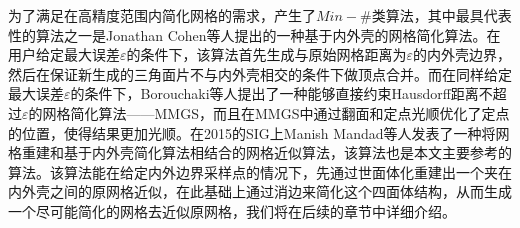为了满足在高精度范围内简化网格的需求，产生了$Min−\#$类算法，其中最具代表性的算法之一是Jonathan Cohen等人提出的一种基于内外壳的网格简化算法\cite{simp-envlop}。在用户给定最大误差$\varepsilon$的条件下，该算法首先生成与原始网格距离为$\varepsilon$的内外壳边界，然后在保证新生成的三角面片不与内外壳相交的条件下做顶点合并。而在同样给定最大误差$\varepsilon$的条件下，Borouchaki等人提出了一种能够直接约束Hausdorff距离不超过$\varepsilon$的网格简化算法——MMGS\cite{mmgs}，而且在MMGS中通过翻面和定点光顺优化了定点的位置，使得结果更加光顺。在2015的SIG上Manish Mandad等人发表了一种将网格重建和基于内外壳简化算法相结合的网格近似算法\cite{isotopic-appro}，该算法也是本文主要参考的算法。该算法能在给定内外边界采样点的情况下，先通过世面体化重建出一个夹在内外壳之间的原网格近似，在此基础上通过消边来简化这个四面体结构，从而生成一个尽可能简化的网格去近似原网格，我们将在后续的章节中详细介绍。
